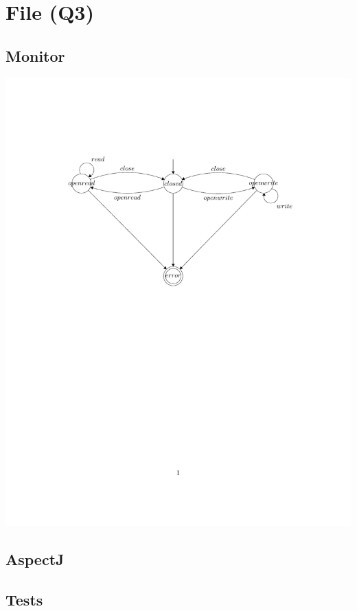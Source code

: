 \documentclass{article}
\begin{document}
\section{File (Q3)}

\subsection{Monitor}

\begin{center}
\includegraphics[width=16cm, clip, trim=3.5cm 14.5cm 3.5cm
4.5cm]{q3.pdf}
\end{center}

\subsection{AspectJ}

\subsection{Tests}
\end{document}
